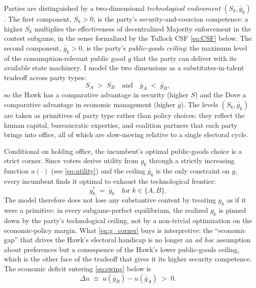\documentclass[11pt,twoside]{extarticle}
\begin{document}
Parties are distinguished by a two-dimensional \emph{technological endowment} $(S_k,\bar g_k)$. The first component, $S_k>0$, is the party's security-and-coercion competence: a higher $S_k$ multiplies the effectiveness of decentralized Majority enforcement in the contest subgame, in the sense formalized by the Tullock CSF \autoref{eq:CSF} below. The second component, $\bar g_k>0$, is the party's \emph{public-goods ceiling}: the maximum level of the consumption-relevant public good $g$ that the party can deliver with its available state machinery. I model the two dimensions as a substitutes-in-talent tradeoff across party types:
\begin{equation} \label{eq:party_endowment}
S_A\;>\;S_B\quad\text{and}\quad\bar g_A\;<\;\bar g_B,
\end{equation}
so the Hawk has a comparative advantage in security (higher $S$) and the Dove a comparative advantage in economic management (higher $\bar g$). The levels $(S_k,\bar g_k)$ are taken as primitives of party type rather than policy choices: they reflect the human capital, bureaucratic expertise, and coalition partners that each party brings into office, all of which are slow-moving relative to a single electoral cycle.

Conditional on holding office, the incumbent's optimal public-goods choice is a strict corner. Since voters derive utility from $g_k$ through a strictly increasing function $u(\cdot)$ (see \autoref{eq:utility}) and the ceiling $\bar g_k$ is the only constraint on $g$, every incumbent finds it optimal to exhaust the technological frontier:
\begin{equation} \label{eq:g_corner}
g_k^{*}\;=\;\bar g_k\quad\text{for }k\in\{A,B\}.
\end{equation}
The model therefore does not lose any substantive content by treating $g_k$ as if it were a primitive: in every subgame-perfect equilibrium, the realized $g_k$ is pinned down by the party's technological ceiling, not by a non-trivial optimization on the economic-policy margin. What \autoref{eq:g_corner} buys is interpretive: the ``economic gap'' that drives the Hawk's electoral handicap is no longer an \emph{ad hoc} assumption about preferences but a consequence of the Hawk's lower public-goods ceiling, which is the other face of the tradeoff that gives it its higher security competence. The economic deficit entering \autoref{eq:swing} below is
\begin{equation} \label{eq:delta_u_def}
\Delta u\;\equiv\;u(\bar g_B)-u(\bar g_A)\;>\;0.
\end{equation}
\end{document}
